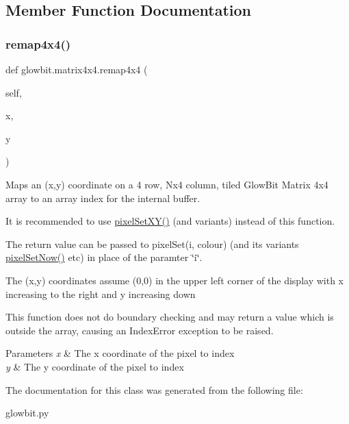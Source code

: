 \subsection{Member Function Documentation}
\mbox{\label{classglowbit_1_1matrix4x4_aea814e3be265990137d4027ae181e58d}} 
\subsubsection{\texorpdfstring{remap4x4()}{remap4x4()}}
{\footnotesize\ttfamily def glowbit.\+matrix4x4.\+remap4x4 (\begin{DoxyParamCaption}\item[{}]{self,  }\item[{}]{x,  }\item[{}]{y }\end{DoxyParamCaption})}



Maps an (x,y) coordinate on a 4 row, Nx4 column, tiled Glow\+Bit Matrix 4x4 array to an array index for the internal buffer. 

It is recommended to use \hyperlink{classglowbit_1_1glowbitMatrix_a5f20884e1b08bc66e54860d0bbf0d22e}{pixel\+Set\+X\+Y()} (and variants) instead of this function.

The return value can be passed to pixel\+Set(i, colour) (and its variants \hyperlink{classglowbit_1_1glowbit_a6f4167e566106d5eb104933b256f2e14}{pixel\+Set\+Now()} etc) in place of the paramter \char`\"{}i\char`\"{}.

The (x,y) coordinates assume (0,0) in the upper left corner of the display with x increasing to the right and y increasing down

This function does not do boundary checking and may return a value which is outside the array, causing an Index\+Error exception to be raised.


\begin{DoxyParams}{Parameters}
{\em x} & The x coordinate of the pixel to index \\
\hline
{\em y} & The y coordinate of the pixel to index \\
\hline
\end{DoxyParams}


The documentation for this class was generated from the following file\+:\begin{DoxyCompactItemize}
\item 
glowbit.\+py\end{DoxyCompactItemize}
